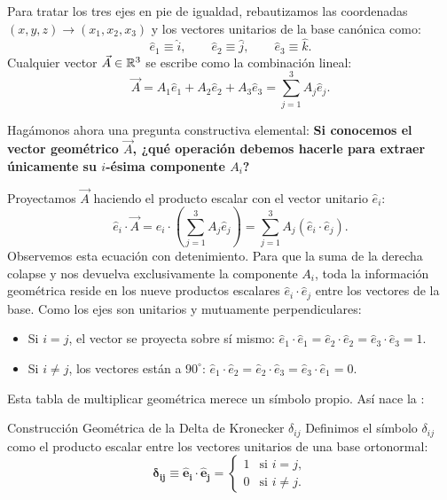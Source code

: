 \documentclass[11pt,letterpaper]{article}
\begin{document}

Para tratar los tres ejes en pie de igualdad, rebautizamos las coordenadas $(x, y, z) \to (x_1, x_2, x_3)$ y los vectores unitarios de la base canónica como:
\[
\hat{e}_1 \equiv \hat{i}, \qquad \hat{e}_2 \equiv \hat{j}, \qquad \hat{e}_3 \equiv \hat{k}.
\]
Cualquier vector $\vec{A} \in \mathbb{R}^3$ se escribe como la combinación lineal:
\[
\vec{A} = A_1 \hat{e}_1 + A_2 \hat{e}_2 + A_3 \hat{e}_3 = \sum_{j=1}^3 A_j \hat{e}_j.
\]

Hagámonos ahora una pregunta constructiva elemental: \textbf{Si conocemos el vector geométrico $\vec{A}$, ¿qué operación debemos hacerle para extraer únicamente su $i$-ésima componente $A_i$?}

Proyectamos $\vec{A}$ haciendo el producto escalar con el vector unitario $\hat{e}_i$:
\[
\hat{e}_i \cdot \vec{A} = \hat{e}_i \cdot \left(\sum_{j=1}^3 A_j \hat{e}_j\right) = \sum_{j=1}^3 A_j (\hat{e}_i \cdot \hat{e}_j).
\]
Observemos esta ecuación con detenimiento. Para que la suma de la derecha colapse y nos devuelva exclusivamente la componente $A_i$, toda la información geométrica reside en los nueve productos escalares $\hat{e}_i \cdot \hat{e}_j$ entre los vectores de la base. Como los ejes son unitarios y mutuamente perpendiculares:
\begin{itemize}
    \item Si $i = j$, el vector se proyecta sobre sí mismo: $\hat{e}_1\cdot\hat{e}_1 = \hat{e}_2\cdot\hat{e}_2 = \hat{e}_3\cdot\hat{e}_3 = 1$.
    \item Si $i \neq j$, los vectores están a $90^\circ$: $\hat{e}_1\cdot\hat{e}_2 = \hat{e}_2\cdot\hat{e}_3 = \hat{e}_3\cdot\hat{e}_1 = 0$.
\end{itemize}

Esta tabla de multiplicar geométrica merece un símbolo propio. Así nace la :

\begin{theorembox}{Construcción Geométrica de la Delta de Kronecker $\delta_{ij}$}
Definimos el símbolo $\delta_{ij}$ como el producto escalar entre los vectores unitarios de una base ortonormal:
\[
\mathbf{\delta_{ij} \equiv \hat{e}_i \cdot \hat{e}_j} = \begin{cases} 1 & \text{si } i = j, \\ 0 & \text{si } i \neq j. \end{cases}
\]
\end{theorembox}
\end{document}
